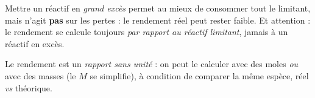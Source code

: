 \documentclass[11pt,a4paper]{article}
\begin{document}
\begin{piege}
Mettre un réactif en \emph{grand excès} permet au mieux de consommer tout le limitant, mais n'agit
\textbf{pas} sur les pertes : le rendement réel peut rester faible. Et attention : le rendement se
calcule toujours \emph{par rapport au réactif limitant}, jamais à un réactif en excès.
\end{piege}

\begin{remarque}
Le rendement est un \emph{rapport sans unité} : on peut le calculer avec des moles \emph{ou} avec des
masses (le $M$ se simplifie), à condition de comparer la même espèce, réel \emph{vs} théorique.
\end{remarque}
\end{document}
